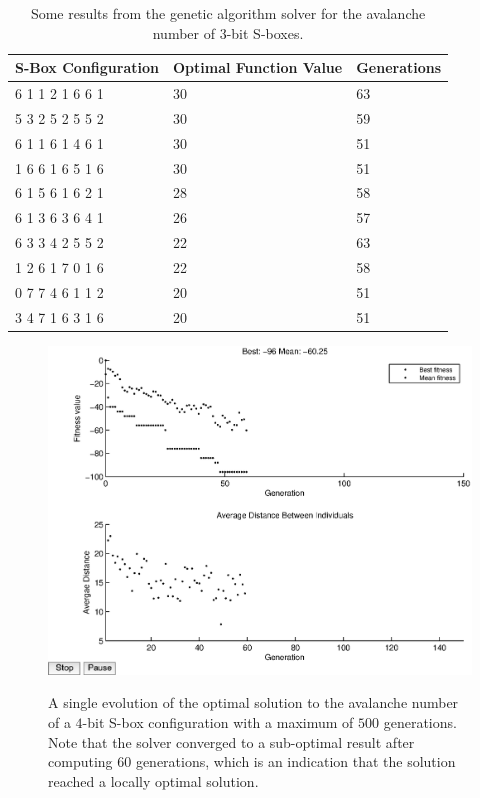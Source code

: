 \documentclass[11pt]{article}
\begin{document}
\begin{table}
	\centering
	\label{avTable}
	\caption{Some results from the genetic algorithm solver for the avalanche number of $3$-bit S-boxes.}
    \begin{tabular}{|l|l|l|}
        \hline
        S-Box Configuration & Optimal Function Value & Generations \\ \hline
        6     1     1     2     1     6     6     1 & 30 & 63 \\
        5     3     2     5     2     5     5     2 & 30 & 59 \\ 
        6     1     1     6     1     4     6     1 & 30 & 51 \\ 
        1     6     6     1     6     5     1     6 & 30 & 51 \\ 
        6     1     5     6     1     6     2     1 & 28 & 58 \\ 
        6     1     3     6     3     6     4     1 & 26 & 57 \\ 
	6     3     3     4     2     5     5     2 & 22 & 63 \\ 
        1     2     6     1     7     0     1     6 & 22 & 58 \\ 
        0     7     7     4     6     1     1     2 & 20 & 51 \\ 
        3     4     7     1     6     3     1     6 & 20 & 51 \\ 
        \hline
    \end{tabular}
\end{table}

\begin{figure}
\centering
	\includegraphics[scale=0.5]{images/avalanche_results16.eps} \\
	\label{av16}
	\caption{A single evolution of the optimal solution to the avalanche number of a $4$-bit S-box configuration with a maximum of $500$ generations. Note that the solver converged to a sub-optimal result after computing $60$ generations, which is an indication that the solution reached a locally optimal solution.}
\end{figure}
\end{document}
